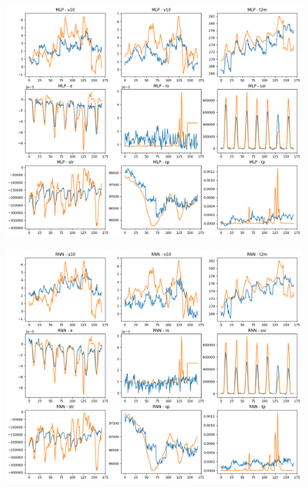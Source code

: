 \begin{figure}[H]
    \centering
    \includegraphics[width=\textwidth]{images/MLP_week.png}
    \caption{}
    \label{mlp-week}
\end{figure}

\begin{figure}[H]
    \centering
    \includegraphics[width=\textwidth]{images/rnn_week.png}
    \caption{}
    \label{rnn-week}
\end{figure}

